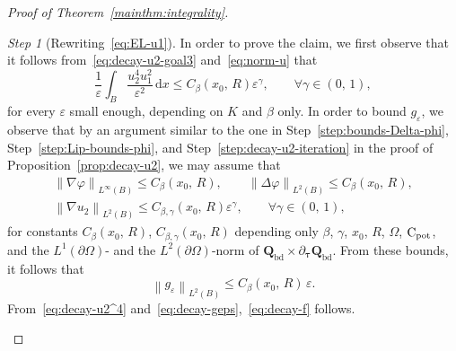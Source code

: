 \documentclass[a4paper, 11pt, twoside, leqno]{article}
\theoremstyle{definition}              %
\theoremstyle{remark}                  %
\newtheorem{step}{Step}
\newcommand{\norm}[1]{\left\| #1 \right\|}                          %
\renewcommand{\d}{\mathrm{d}}
\newcommand{\Q}{\mathbf{Q}}
\newcommand{\eps}{\varepsilon}
\newcommand{\Cpot}{{\rm C}_{\rm pot}}
\newcommand{\ttau}{{\boldsymbol{\tau}}}
\newcommand{\Qb}{\Q_{\mathrm{bd}}}
\begin{document}
\begin{proof}[{Proof of Theorem~\ref{mainthm:integrality}}]
\begin{step}[Rewriting~\eqref{eq:EL-u1}]
	In order to prove the claim, we first observe that it follows 
	from~\eqref{eq:decay-u2-goal3} and~\eqref{eq:norm-u} that 
    \begin{equation}\label{eq:decay-u2^4}
        \frac{1}{\eps}\int_B \frac{u_2^4 u_1^2}{\eps^2}\,{\d}x \leq 
        C_\beta(x_0,\,R) \eps^\gamma, \qquad \forall \gamma \in (0,\,1),
    \end{equation}
    for every $\eps$ small enough, depending on $K$ and $\beta$ only. 
    In order to bound $g_\eps$, we observe that 
    by an argument similar to the one in 
    Step~\ref{step:bounds-Delta-phi}, Step~\ref{step:Lip-bounds-phi}, 
    and Step~\ref{step:decay-u2-iteration}
    in the proof of Proposition~\ref{prop:decay-u2}, we may assume that 
    \begin{gather*}
        \norm{\nabla \varphi}_{L^\infty(B)} \leq C_\beta(x_0,\,R), \qquad 
        \norm{\Delta \varphi}_{L^2(B)} \leq C_\beta(x_0,\,R),  \\ 
        \norm{\nabla u_2}_{L^2(B)} \leq  C_{\beta,\gamma}(x_0,\,R) \eps^{\gamma}, 
        \qquad \forall \gamma \in (0,\,1),
    \end{gather*}
    for constants $C_\beta(x_0,\,R)$, $C_{\beta,\gamma}(x_0,\,R)$ 
    depending only $\beta$, $\gamma$, $x_0$, $R$, $\Omega$, $\Cpot$, 
    and the $L^1(\partial \Omega)$- and the $L^2(\partial \Omega)$-norm 
    of $\Qb \times \partial_\ttau \Qb$. From these bounds, it follows that
    \begin{equation}\label{eq:decay-geps}
        \norm{g_\eps}_{L^2(B)} \leq C_\beta(x_0,\,R)\,\eps.
    \end{equation}
    From~\eqref{eq:decay-u2^4} and~\eqref{eq:decay-geps},~\eqref{eq:decay-f} follows.
    

\end{step}
\end{proof}
\end{document}
